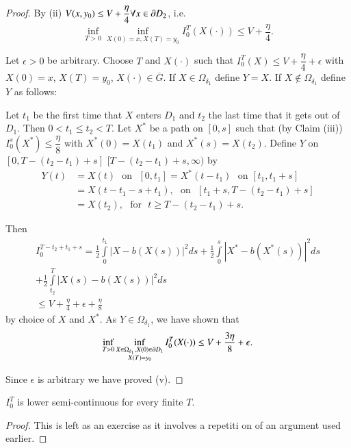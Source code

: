 \begin{proof}
By (ii) $V(x,y_{0})\leq V+\dfrac{\eta}{4}\forall x\in \partial D_{2}$, i.e.
$$
\inf\limits_{T>0}\inf\limits_{X(0)=x,X(T)=y_{0}}I^{T}_{0}(X(\cdot))\leq
V+\dfrac{\eta}{4}. 
$$

Let $\epsilon>0$ be arbitrary. Choose $T$ and $X(\cdot)$ such that
$I^{T}_{0}(X)\leq V+\dfrac{\eta}{4}+\epsilon$ with $X(0)=x$,
$X(T)=y_{0}$, $X(\cdot)\in \overline{G}$. If $X\in\Omega_{\delta_{1}}$
define $Y=X$. If $X\not\in \Omega_{\delta_{1}}$ define $Y$ as follows:

Let $t_{1}$ be the first time that $X$ enters $D_{1}$ and $t_{2}$ the
last time that it gets out of $D_{1}$. Then $0<t_{1}\leq t_{2}<T$. Let
$X^{*}$ be a path on $[0,s]$ such that (by Claim (iii))
$I^{s}_{0}(X^{*})\leq \dfrac{\eta}{8}$ with $X^{*}(0)=X(t_{1})$ and
$X^{*}(s)=X(t_{2})$. Define $Y$ on $[0,T-(t_{2}-t_{1})+s]$
$[T-(t_{2}-t_{1})+s,\infty)$ by
\begin{align*}
Y(t) &= X(t)\text{~ on~ } [0,t_{1}]=X^{*}(t-t_{1})\text{~ on~
}[t_{1},t_{1}+s]\\
&= X(t-t_{1}-s+t_{1}),\text{~ on~ }[t_{1}+s,T-(t_{2}-t_{1})+s]\\
&= X(t_{2}),\text{~ for~ }t\geq T-(t_{2}-t_{1})+s.
\end{align*}

Then
\begin{gather*}
I^{T-t_{2}+t_{1}+s}_{0}=\frac{1}{2}\int\limits^{t_{1}}_{0}|X-b(X(s))|^{2}ds+\frac{1}{2}\int\limits^{s}_{0}|X^{*}-b(X^{*}(s))|^{2}ds\\
+\frac{1}{2}\int\limits^{T}_{t_{2}}|X(s)-b(X(s))|^{2}ds\\
\leq V+\frac{\eta}{4}+\epsilon+\frac{\eta}{8}
\end{gather*}\pageoriginale
by choice of $X$ and $X^{*}$. As $Y\in \Omega_{\delta_{1}}$, we have
shown that
\begin{gather*}
\inf\limits_{T>0}\inf\limits_{\substack{X\in
    \Omega_{\delta_{1}},X(0)\in \partial
    D_{1}\\ X(T)=y_{0}}}I^{T}_{0}(X(\cdot))\leq V+\frac{3\eta}{8}+\epsilon.
\end{gather*}

Since $\epsilon$ is arbitrary we have proved (v).
\end{proof}

\begin{lemma*}
$I^{T}_{0}$ is lower semi-continuous for every finite $T$.
\end{lemma*}

\begin{proof}
This is left as an exercise as it involves a repetiti on of an
argument used earlier.
\end{proof}


